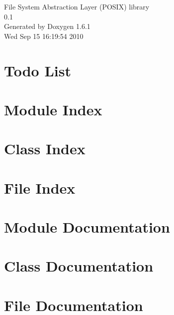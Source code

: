 \documentclass[a4paper]{book}
\begin{document}
\begin{titlepage}
\vspace*{7cm}
\begin{center}
{\Large File System Abstraction Layer (POSIX) library \\[1ex]\large 0.1 }\\
\vspace*{1cm}
{\large Generated by Doxygen 1.6.1}\\
\vspace*{0.5cm}
{\small Wed Sep 15 16:19:54 2010}\\
\end{center}
\end{titlepage}
\clearemptydoublepage
{}
\tableofcontents
\clearemptydoublepage
{}
\chapter{Todo List}
\label{todo}

\chapter{Module Index}

\chapter{Class Index}

\chapter{File Index}

\chapter{Module Documentation}

\chapter{Class Documentation}

\chapter{File Documentation}























\printindex
\end{document}
